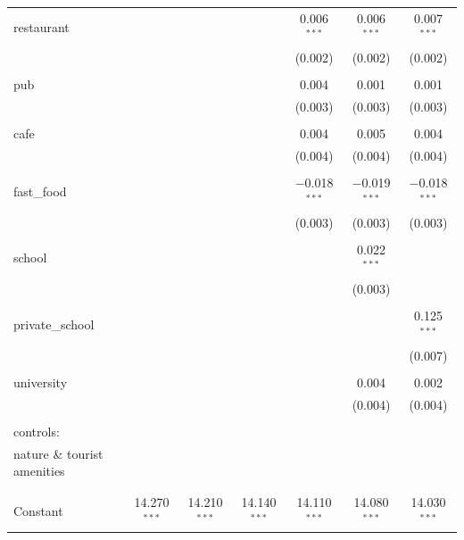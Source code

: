\documentclass{article}
\begin{document}
\begin{table}[H]
\begin{tabular}{@{\extracolsep{-5pt}}lcccccc}
 restaurant &  &  &  & 0.006$^{***}$ & 0.006$^{***}$ & 0.007$^{***}$ \\ 
  &  &  &  & (0.002) & (0.002) & (0.002) \\ 
  & & & & & & \\ 
 pub &  &  &  & 0.004 & 0.001 & 0.001 \\ 
  &  &  &  & (0.003) & (0.003) & (0.003) \\ 
  & & & & & & \\ 
 cafe &  &  &  & 0.004 & 0.005 & 0.004 \\ 
  &  &  &  & (0.004) & (0.004) & (0.004) \\ 
  & & & & & & \\ 
 fast\_food &  &  &  & $-$0.018$^{***}$ & $-$0.019$^{***}$ & $-$0.018$^{***}$ \\ 
  &  &  &  & (0.003) & (0.003) & (0.003) \\ 
  & & & & & & \\ 
 school &  &  &  &  & 0.022$^{***}$ &  \\ 
  &  &  &  &  & (0.003) &  \\ 
  & & & & & & \\ 
 private\_school &  &  &  &  &  & 0.125$^{***}$ \\ 
  &  &  &  &  &  & (0.007) \\ 
  & & & & & & \\ 
 university &  &  &  &  & 0.004 & 0.002 \\ 
  &  &  &  &  & (0.004) & (0.004) \\ 
  & & & & & & \\
 controls: \\ nature \& tourist amenities &  &  &  &  &  &  \\ 
  &  &  &  &  &  &  \\ 
  & & & & & & \\
 Constant & 14.270$^{***}$ & 14.210$^{***}$ & 14.140$^{***}$ & 14.110$^{***}$ & 14.080$^{***}$ & 14.030$^{***}$ \\ 

\end{tabular}
\end{table}
\end{document}
